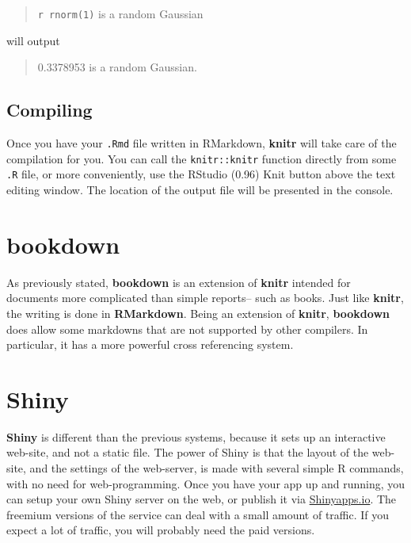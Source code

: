 \documentclass[]{book}
\theoremstyle{definition}
\theoremstyle{definition}
\theoremstyle{definition}
\theoremstyle{remark}
\begin{document}
\begin{quote}
\texttt{\textasciigrave{}r\ rnorm(1)\textasciigrave{}} is a random
Gaussian
\end{quote}

will output

\begin{quote}
0.3378953 is a random Gaussian.
\end{quote}

\subsection{Compiling}\label{compiling}

Once you have your \texttt{.Rmd} file written in RMarkdown,
\textbf{knitr} will take care of the compilation for you. You can call
the \texttt{knitr::knitr} function directly from some \texttt{.R} file,
or more conveniently, use the RStudio (0.96) Knit button above the text
editing window. The location of the output file will be presented in the
console.

\section{bookdown}\label{bookdown}

As previously stated, \textbf{bookdown} is an extension of
\textbf{knitr} intended for documents more complicated than simple
reports-- such as books. Just like \textbf{knitr}, the writing is done
in \textbf{RMarkdown}. Being an extension of \textbf{knitr},
\textbf{bookdown} does allow some markdowns that are not supported by
other compilers. In particular, it has a more powerful cross referencing
system.

\section{Shiny}\label{shiny}

\textbf{Shiny} \citep{shiny} is different than the previous systems,
because it sets up an interactive web-site, and not a static file. The
power of Shiny is that the layout of the web-site, and the settings of
the web-server, is made with several simple R commands, with no need for
web-programming. Once you have your app up and running, you can setup
your own Shiny server on the web, or publish it via
\href{https://www.shinyapps.io/}{Shinyapps.io}. The freemium versions of
the service can deal with a small amount of traffic. If you expect a lot
of traffic, you will probably need the paid versions.
\end{document}

